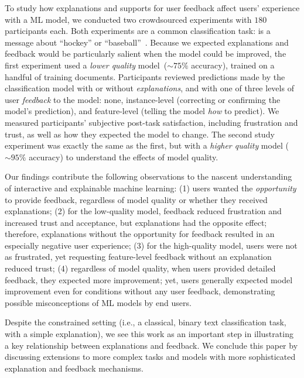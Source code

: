 To study how explanations and supports for user feedback affect users' 
experience with a ML model, we conducted two crowdsourced experiments
with $180$ participants each.
%
Both experiments are a common classification task: is a message about
``hockey'' or ``baseball''~\cite{Settles2011ClosingInstances, Kulesza2015PrinciplesLearning}.
%
Because we expected explanations and feedback would be particularly salient when the model could be improved, the first experiment used a \textit{lower quality} model~($\sim 75\%$ accuracy), trained on a handful of
training documents.
%
Participants reviewed
predictions made by the classification model with or
without \textit{explanations},
and with one of three levels of user \textit{feedback} to the
model: none, instance-level (correcting or confirming the model's prediction), and feature-level (telling the model \textit{how} to predict). 
%
We measured participants' subjective post-task satisfaction, including frustration and trust, as well as
how they expected the model to change. 
%
The second study experiment was exactly the same as the first, but with a \textit{higher quality} model ($\sim 95\%$ accuracy) to understand the effects of model quality.

Our findings contribute the following observations to the nascent
understanding of interactive and explainable machine learning:
%
(1) users wanted the \textit{opportunity} to provide feedback, regardless of model quality or whether they received explanations; 
%
(2) for the low-quality model, feedback reduced frustration and increased trust and acceptance, but explanations had the opposite effect; therefore, explanations without the opportunity for feedback resulted in an especially negative user experience;
%
(3) for the high-quality model, users were not as frustrated, yet requesting feature-level feedback without an explanation reduced trust; %
%
(4) regardless of model quality, when users  %
provided detailed feedback, they expected more improvement; yet, users generally expected model improvement even for conditions without any user feedback, demonstrating possible misconceptions of ML models by end users.
%

Despite the constrained setting (i.e., a classical, binary text classification task, with a simple explanation), we see this work as an important step in illustrating a key relationship between explanations and feedback. We conclude this paper by discussing extensions to more complex tasks and models with more sophisticated explanation and feedback mechanisms.